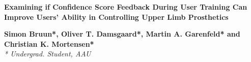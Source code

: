 
%

\begin{center}	
	{\huge\textbf{Examining if Confidence Score Feedback During User Training Can Improve Users' Ability in Controlling Upper Limb Prosthetics}}
	
	
	{\large \textbf{Simon Bruun*, Oliver T. Damsgaard*, Martin A. Garenfeld* and Christian K. Mortensen*}} \\
{\small \textit{* Undergrad. Student, AAU}}
\end{center}

